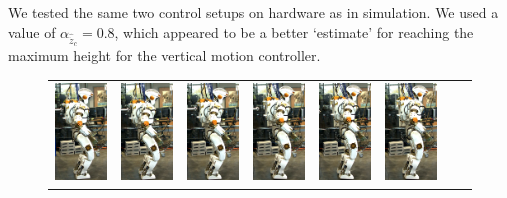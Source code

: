 \documentclass[letterpaper, 10 pt, conference]{ieeeconf}  %
\begin{document}
We tested the same two control setups on hardware as in simulation. We used a value of $\alpha_{\hat{\ddot{z}}_{c}}=0.8$, which appeared to be a better `estimate' for reaching the maximum height for the vertical motion controller.
\begin{figure}[h]
\centering
  \begin{tabular}{cccccccc}
    \includegraphics[width=0.72in]{val1c} &
    \includegraphics[width=0.72in]{val2c} &
    \includegraphics[width=0.72in]{val3c} &
    \includegraphics[width=0.72in]{val4c} &
    \includegraphics[width=0.72in]{val5c} &
    \includegraphics[width=0.72in]{val6c} &

\end{tabular}
\end{figure}
\end{document}
